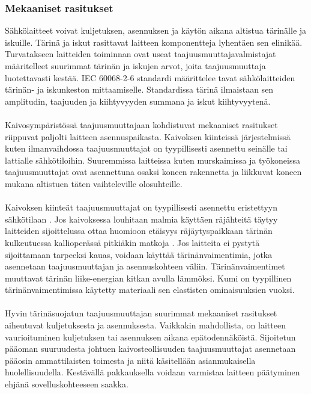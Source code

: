 \documentclass[finnish,12pt,a4paper,pdftex,elec,utf8]{aaltothesis}
\begin{document}
\subsubsection{Mekaaniset rasitukset}
Sähkölaitteet voivat kuljetuksen, asennuksen ja käytön aikana altistua tärinälle ja iskuille. Tärinä ja iskut rasittavat laitteen komponentteja lyhentäen sen elinikää. Turvatakseen laitteiden toiminnan ovat useat taajuusmuuttajavalmistajat määritelleet suurimmat tärinän ja iskujen arvot, joita taajuusmuuttaja luotettavasti kestää. IEC 60068-2-6 \cite{IEC60068} standardi määrittelee tavat sähkölaitteiden tärinän- ja iskunkeston mittaamiselle. Standardissa tärinä ilmaistaan sen amplitudin, taajuuden ja kiihtyvyyden summana ja iskut kiihtyvyytenä.
\\\\
Kaivosympäristössä taajuusmuuttajaan kohdistuvat mekaaniset rasitukset riippuvat paljolti laitteen asennuspaikasta. Kaivoksen kiinteissä järjestelmissä kuten ilmanvaihdossa taajuusmuuttajat on tyypillisesti asennettu seinälle tai lattialle sähkötiloihin. Suuremmissa laitteissa kuten murskaimissa ja työkoneissa taajuusmuuttajat ovat asennettuna osaksi koneen rakennetta ja liikkuvat koneen mukana altistuen täten vaihteleville olosuhteille.
\\\\
Kaivoksen kiinteät taajuusmuuttajat on tyypillisesti asennettu eristettyyn sähkötilaan \cite{MyyntiHaastattelu}. Jos kaivoksessa louhitaan malmia käyttäen räjähteitä täytyy laitteiden sijoittelussa ottaa huomioon etäisyys räjäytyspaikkaan tärinän kulkeutuessa kallioperässä pitkiäkin matkoja \cite{Sirkko}. Jos laitteita ei pystytä sijoittamaan tarpeeksi kauas, voidaan käyttää tärinänvaimentimia, jotka asennetaan taajuusmuuttajan ja asennuskohteen väliin. Tärinänvaimentimet muuttavat tärinän liike-energian kitkan avulla lämmöksi. Kumi on tyypillinen tärinänvaimentimissa käytetty materiaali sen elastisten ominaisuuksien vuoksi.
\\\\
Hyvin tärinäsuojatun taajuusmuuttajan suurimmat mekaaniset rasitukset aiheutuvat kuljetuksesta ja asennuksesta. Vaikkakin mahdollista, on laitteen vaurioituminen kuljetuksen tai asennuksen aikana epätodennäköistä. Sijoitetun pääoman suuruudesta johtuen kaivosteollisuuden taajuusmuuttajat asennetaan pääosin ammattilaisten toimesta ja niitä käsitellään asianmukaisella huolellisuudella. Kestävällä pakkauksella voidaan varmistaa laitteen päätyminen ehjänä sovelluskohteeseen saakka.
\end{document}
